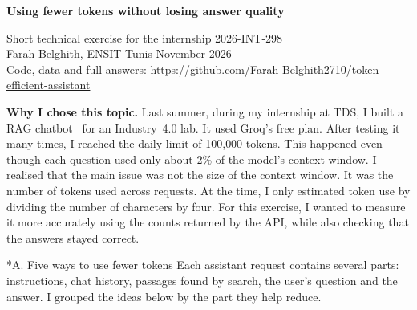 \documentclass[10pt,a4paper]{article}
\makeatletter
\renewcommand\section{\@startsection{section}{1}{\z@}{0.9em}{0.35em}{\normalfont\large\bfseries}}
\makeatother
\begin{document}
{\LARGE\bfseries Using fewer tokens without losing answer quality\par}
\vspace{0.3em}
{\small Short technical exercise for the internship 2026-INT-298\\
Farah Belghith, ENSIT Tunis \textperiodcentered{} November 2026\\
Code, data and full answers: \url{https://github.com/Farah-Belghith2710/token-efficient-assistant}\par}
\vspace{0.4em}

\textbf{Why I chose this topic.}
Last summer, during my internship at TDS, I built a RAG chatbot~\cite{lewis} for an Industry~4.0 lab. It used Groq's free plan.
After testing it many times, I reached the daily limit of 100{,}000 tokens. This happened even though each question used only about 2\% of the model's context window.
I realised that the main issue was not the size of the context window. It was the number of tokens used across requests.
At the time, I only estimated token use by dividing the number of characters by four.
For this exercise, I wanted to measure it more accurately using the counts returned by the API, while also checking that the answers stayed correct.

\section*{A. Five ways to use fewer tokens}
Each assistant request contains several parts: instructions, chat history, passages found by search, the user's question and the answer.
I grouped the ideas below by the part they help reduce.
\end{document}
